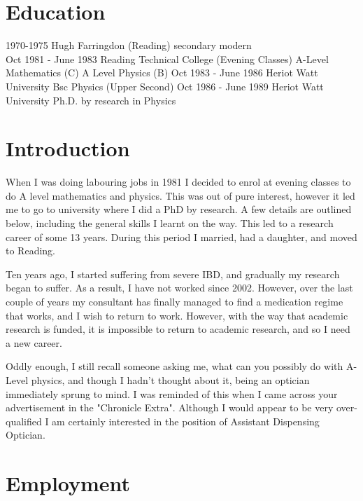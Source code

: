 \begin{flushleft}
\section{Education}

1970-1975   Hugh Farringdon (Reading) secondary modern \\
Oct 1981 - June 1983 Reading Technical College (Evening Classes) \newline
A-Level Mathematics (C) 
A Level Physics (B) \newline
Oct 1983 - June 1986  Heriot Watt University \newline
Bsc Physics (Upper Second) \newline
Oct 1986 - June 1989 Heriot Watt University  \newline
Ph.D. by research in Physics 

\section{Introduction}

When I was doing labouring jobs in 1981 I decided to enrol at evening classes to do A level
mathematics and physics. This was out of pure interest, however it led me to go to university
where I did a PhD by research. A few details are outlined below, including the general skills
I learnt on the way. This led to a research career of some 13 years. During this period
I married, had a daughter, and moved to Reading.

Ten years ago, I started suffering from severe IBD, and gradually my research began to
suffer. As a result, I have not worked since 2002. However, over the last couple of years
my consultant has finally managed to find a medication regime that works, and I wish to return to
work. However, with the way that academic research is funded, it is impossible to return
to academic research, and so I need  a new career.

Oddly enough, I still recall someone asking me, what can you possibly do with A-Level physics,
and though I hadn't thought about it, being an optician immediately sprung to mind. I was reminded 
of this when I came across your advertisement in the "Chronicle Extra". Although I would appear to
be very over-qualified I am certainly interested in the position of Assistant Dispensing Optician.


\section{Employment}


\end{flushleft}
